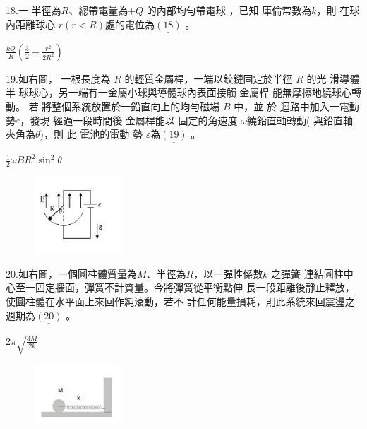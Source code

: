 \documentclass[cn,10pt,math=newtx]{elegantbook}
\begin{document}
\newpage



\begin{example}
   18.一 半徑為$R$、總帶電量為$+Q$ 的內部均勻帶電球 ，已知 庫倫常數為$k$，則 在球內距離球心
$r(r<R)處$的電位為$\underline{(18)}$ 。\\
    \rightline{[文華高中教甄109]}
\end{example}
\begin{solution}
    $\frac{kQ}{R}(\frac{3}{2}-\frac{r^2}{2R^2})$
\end{solution}

\newpage


\begin{example}
   19.如右圖， 一根長度為 $R$ 的輕質金屬桿，一端以鉸鏈固定於半徑 $R$ 的光
滑導體 半 球球心，另一端有一金屬小球與導體球內表面接觸 金屬桿
能無摩擦地繞球心轉動。 若 將整個系統放置於一鉛直向上的均勻磁場
$B$ 中，並 於 迴路中加入一電動勢$\varepsilon$，發現 經過一段時間後 金屬桿能以
固定的角速度 $\omega$繞鉛直軸轉動( 與鉛直軸夾角為$\theta$)，則 此 電池的電動
勢 $\varepsilon$為$\underline{(19)}$ 。\\
    \rightline{[文華高中教甄109]}
\end{example}
\begin{solution}
    $\frac{1}{2} \omega BR^2 \sin^2 {\theta}$
\end{solution}
\begin{figure}[htbp]
    \flushright
    \includegraphics[width=0.3\textwidth]{image/109文華19.png}
  \end{figure}
\newpage


\begin{example}
   20.如右圖，一個圓柱體質量為$M$、半徑為$R$，以一彈性係數$k$ 之彈簧
連結圓柱中心至一固定牆面，彈簧不計質量。今將彈簧從平衡點伸
長一段距離後靜止釋放，使圓柱體在水平面上來回作純滾動，若不
計任何能量損耗，則此系統來回震盪之週期為$\underline{(20)}$ 。\\
    \rightline{[文華高中教甄109]}
\end{example}
\begin{solution}
    $2\pi \sqrt{\frac{3M}{2k}}$
\end{solution}
\begin{figure}[htbp]
    \flushright
    \includegraphics[width=0.3\textwidth]{image/109文華20.png}
  \end{figure}
\newpage
\end{document}
